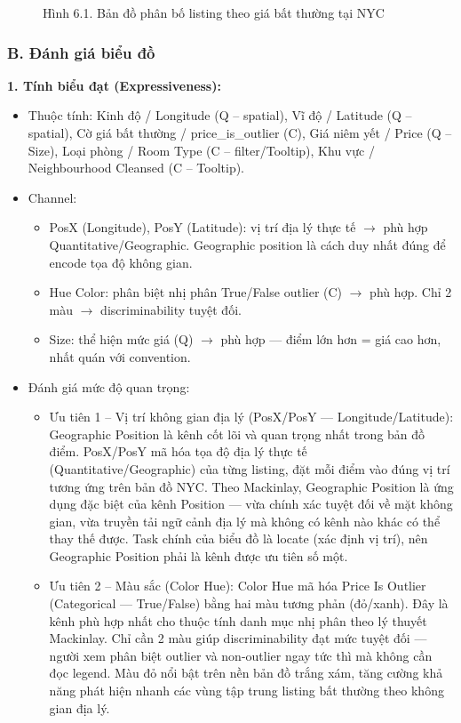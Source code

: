\begin{figure}[H]
    \centering
    \caption{Hình 6.1. Bản đồ phân bố listing theo giá bất thường tại NYC}
    \label{fig:domain-task6-chart1}
\end{figure}

\subsubsection*{B. Đánh giá biểu đồ}

\textbf{1. Tính biểu đạt (Expressiveness):}

\begin{itemize}
    \item Thuộc tính: Kinh độ / Longitude (Q -- spatial), Vĩ độ / Latitude (Q -- spatial), Cờ giá bất thường / price\_is\_outlier (C), Giá niêm yết / Price (Q -- Size), Loại phòng / Room Type (C -- filter/Tooltip), Khu vực / Neighbourhood Cleansed (C -- Tooltip).
    \item Channel:
    \begin{itemize}
        \item PosX (Longitude), PosY (Latitude): vị trí địa lý thực tế $\rightarrow$ phù hợp Quantitative/Geographic. Geographic position là cách duy nhất đúng để encode tọa độ không gian.
        \item Hue Color: phân biệt nhị phân True/False outlier (C) $\rightarrow$ phù hợp. Chỉ 2 màu $\rightarrow$ discriminability tuyệt đối.
        \item Size: thể hiện mức giá (Q) $\rightarrow$ phù hợp --- điểm lớn hơn = giá cao hơn, nhất quán với convention.
    \end{itemize}
    \item Đánh giá mức độ quan trọng:
    \begin{itemize}
        \item Ưu tiên 1 -- Vị trí không gian địa lý (PosX/PosY --- Longitude/Latitude): Geographic Position là kênh cốt lõi và quan trọng nhất trong bản đồ điểm. PosX/PosY mã hóa tọa độ địa lý thực tế (Quantitative/Geographic) của từng listing, đặt mỗi điểm vào đúng vị trí tương ứng trên bản đồ NYC. Theo Mackinlay, Geographic Position là ứng dụng đặc biệt của kênh Position --- vừa chính xác tuyệt đối về mặt không gian, vừa truyền tải ngữ cảnh địa lý mà không có kênh nào khác có thể thay thế được. Task chính của biểu đồ là locate (xác định vị trí), nên Geographic Position phải là kênh được ưu tiên số một.
        \item Ưu tiên 2 -- Màu sắc (Color Hue): Color Hue mã hóa Price Is Outlier (Categorical --- True/False) bằng hai màu tương phản (đỏ/xanh). Đây là kênh phù hợp nhất cho thuộc tính danh mục nhị phân theo lý thuyết Mackinlay. Chỉ cần 2 màu giúp discriminability đạt mức tuyệt đối --- người xem phân biệt outlier và non-outlier ngay tức thì mà không cần đọc legend. Màu đỏ nổi bật trên nền bản đồ trắng xám, tăng cường khả năng phát hiện nhanh các vùng tập trung listing bất thường theo không gian địa lý.

\end{itemize}
\end{itemize}
